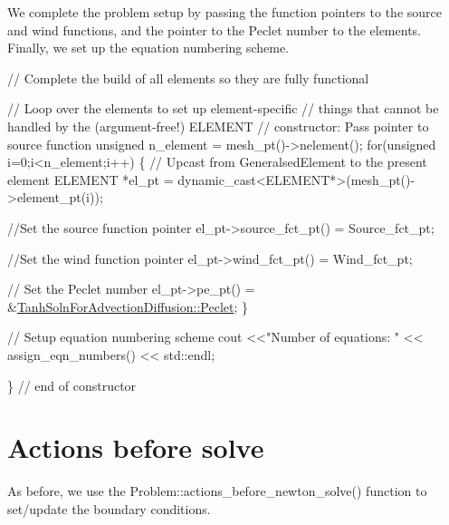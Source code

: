 We complete the problem setup by passing the function pointers to the source and wind functions, and the pointer to the Peclet number to the elements. Finally, we set up the equation numbering scheme.


\begin{DoxyCodeInclude}
 \textcolor{comment}{// Complete the build of all elements so they are fully functional }

 \textcolor{comment}{// Loop over the elements to set up element-specific }
 \textcolor{comment}{// things that cannot be handled by the (argument-free!) ELEMENT }
 \textcolor{comment}{// constructor: Pass pointer to source function}
 \textcolor{keywordtype}{unsigned} n\_element = mesh\_pt()->nelement();
 \textcolor{keywordflow}{for}(\textcolor{keywordtype}{unsigned} i=0;i<n\_element;i++)
  \{
   \textcolor{comment}{// Upcast from GeneralsedElement to the present element}
   ELEMENT *el\_pt = \textcolor{keyword}{dynamic\_cast<}ELEMENT*\textcolor{keyword}{>}(mesh\_pt()->element\_pt(i));

   \textcolor{comment}{//Set the source function pointer}
   el\_pt->source\_fct\_pt() = Source\_fct\_pt;

   \textcolor{comment}{//Set the wind function pointer}
   el\_pt->wind\_fct\_pt() = Wind\_fct\_pt;

   \textcolor{comment}{// Set the Peclet number}
   el\_pt->pe\_pt() = &\hyperlink{namespaceTanhSolnForAdvectionDiffusion_aeba486af70e92ab7eec1da3ce44d51ee}{TanhSolnForAdvectionDiffusion::Peclet};
  \}

 \textcolor{comment}{// Setup equation numbering scheme}
 cout <<\textcolor{stringliteral}{"Number of equations: "} << assign\_eqn\_numbers() << std::endl; 

\} \textcolor{comment}{// end of constructor}

\end{DoxyCodeInclude}




 

\hypertarget{index_actions_before}{}\section{Actions before solve}\label{index_actions_before}
As before, we use the {\ttfamily Problem\+::actions\+\_\+before\+\_\+newton\+\_\+solve()} function to set/update the boundary conditions.


